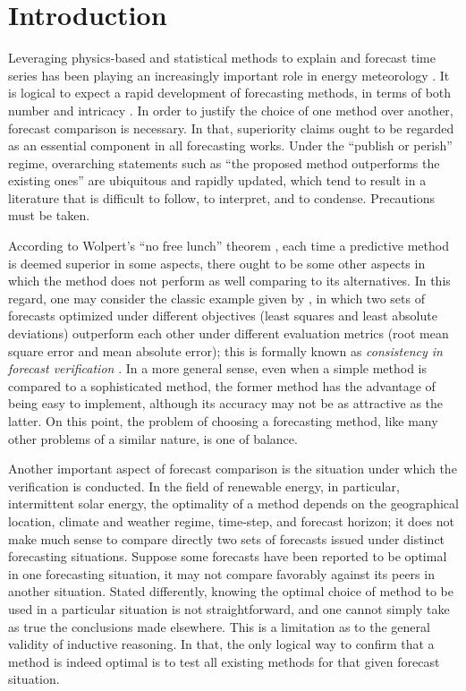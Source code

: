 \section{Introduction}
\label{sec:1}

Leveraging physics-based and statistical methods to explain and forecast time series has been playing an increasingly important role in energy meteorology \citep{article3,NOTTON201896}. It is logical to expect a rapid development of forecasting methods, in terms of both number and intricacy \citep{makridakis2021future}. In order to justify the choice of one method over another, forecast comparison is necessary. In that, superiority claims ought to be regarded as an essential component in all forecasting works. Under the ``publish or perish'' regime, overarching statements such as ``the proposed method outperforms the existing ones'' are ubiquitous and rapidly updated, which tend to result in a literature that is difficult to follow, to interpret, and to condense. Precautions must be taken. 

According to Wolpert's ``no free lunch'' theorem \citep{inbook1}, each time a predictive method is deemed superior in some aspects, there ought to be some other aspects in which the method does not perform as well comparing to its alternatives. In this regard, one may consider the classic example given by \citet{Gneiting2011}, in which two sets of forecasts optimized under different objectives (least squares and least absolute deviations) outperform each other under different evaluation metrics (root mean square error and mean absolute error); this is formally known as \textit{consistency in forecast verification} \citep{YANG202020}. In a more general sense, even when a simple method is compared to a sophisticated method, the former method has the advantage of being easy to implement, although its accuracy may not be as attractive as the latter. On this point, the problem of choosing a forecasting method, like many other problems of a similar nature, is one of balance. 

Another important aspect of forecast comparison is the situation under which the verification is conducted. In the field of renewable energy, in particular, intermittent solar energy, the optimality of a method depends on the geographical location, climate and weather regime, time-step, and forecast horizon; it does not make much sense to compare directly two sets of forecasts issued under distinct forecasting situations. Suppose some forecasts have been reported to be optimal in one forecasting situation, it may not compare favorably against its peers in another situation. Stated differently, knowing the optimal choice of method to be used in a particular situation is not straightforward, and one cannot simply take as true the conclusions made elsewhere. This is a limitation as to the general validity of inductive reasoning. In that, the only logical way to confirm that a method is indeed optimal is to test all existing methods for that given forecast situation.

